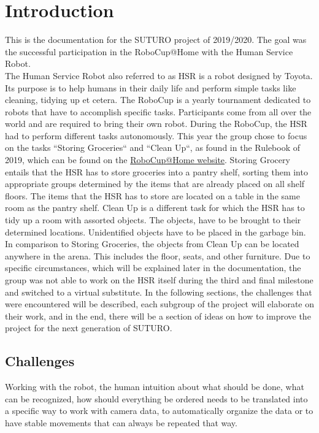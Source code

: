 \documentclass[main.tex]{subfiles}
\begin{document}
	\chapter{Introduction}
	\label{introduction}
	
	This is the documentation for the SUTURO project of 2019/2020. The goal was the successful participation in the RoboCup@Home with the Human Service Robot. \\
	The Human Service Robot also referred to as HSR is a robot designed by Toyota. Its purpose is to help humans in their daily life and perform simple tasks like cleaning, tidying up et cetera. The RoboCup is a yearly tournament dedicated to robots that have to accomplish specific tasks. Participants come from all over the world and are required to bring their own robot.
During the RoboCup, the HSR had to perform different tasks autonomously.
This year the group chose to focus on the tasks “Storing Groceries“ and “Clean Up“, as found in the Rulebook of 2019, which can be found on the \href{http://www.robocupathome.org/rules}{RoboCup@Home website}. 
	Storing Grocery entails that the HSR has to store groceries into a pantry shelf, sorting them into appropriate groups determined by the items that are already placed on all shelf floors. The items that the HSR has to store are located on a table in the same room as the pantry shelf.
Clean Up is a different task for which the HSR has to tidy up a room with assorted objects. The objects, have to be brought to their determined locations. Unidentified objects have to be placed in the garbage bin. In comparison to Storing Groceries, the objects from Clean Up can be located anywhere in the arena. This includes the floor, seats, and other furniture.
Due to specific circumstances, which will be explained later in the documentation, the group was not able to work on the HSR itself during the third and final milestone and switched to a virtual substitute.
	In the following sections, the challenges that were encountered will be described, each subgroup of the project will elaborate on their work, and in the end, there will be a section of ideas on how to improve the project for the next generation of SUTURO.
	
	\section{Challenges}
	\label{challanges}
	Working with the robot, the human intuition about what should be done, what can be recognized, how should everything be ordered needs to be translated into a specific way to work with camera data, to automatically organize the data or to have stable movements that can always be repeated that way.\\
	
\end{document}

